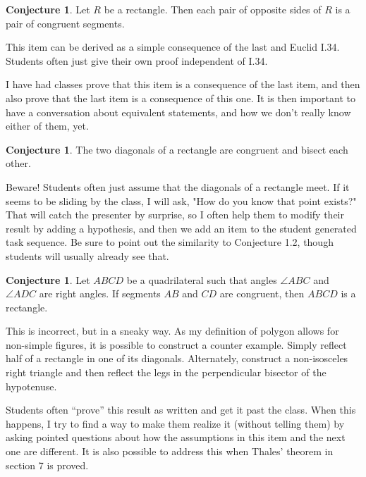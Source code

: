 \documentclass{tufte-handout}
\theoremstyle{definition}
\newtheorem{conjecture}[problem]{Conjecture}
\begin{document}
\begin{conjecture}
\label{conj:rectangle-opp-sides}
Let $R$ be a rectangle. Then each pair of opposite sides of $R$ is a pair of congruent segments.
\end{conjecture}

This item can be derived as a simple consequence of the last and Euclid I.34. Students often just give their own proof independent of I.34.

I have had classes prove that this item is a consequence of the last item, and then also prove that the last item is a consequence of this one. It is then important to have a conversation about equivalent statements, and how we don't really know either of them, yet.

\begin{conjecture}
\label{conj:rectangle-diagonals}
The two diagonals of a rectangle are congruent and bisect each other.
\end{conjecture}

Beware! Students often just assume that the diagonals of a rectangle meet. If it seems to be sliding by the class, I will ask, "How do you know that point exists?" That will catch the presenter by surprise, so I often help them to modify their result by adding a hypothesis, and then we add an item to the student generated task sequence. Be sure to point out the similarity to Conjecture 1.2, though students will usually already see that.


\begin{conjecture}
\label{conj:opp-congruent-implies-rectangle}
Let $ABCD$ be a quadrilateral such that angles $\angle ABC$ and $\angle ADC$ are right angles.
If segments $AB$ and $CD$ are congruent, then $ABCD$ is a rectangle.
\end{conjecture}

This is incorrect, but in a sneaky way. As my definition of polygon allows for non-simple figures, it is possible to construct a counter example. Simply reflect half of a rectangle in one of its diagonals. Alternately, construct a non-isosceles right triangle and then reflect the legs in the perpendicular bisector of the hypotenuse.

Students often ``prove'' this result as written and get it past the class. When this happens, I try to find a way to make them realize it (without telling them) by asking pointed questions about how the assumptions in this item and the next one are different. 
It is also possible to address this when Thales' theorem in section 7 is proved.
\end{document}
